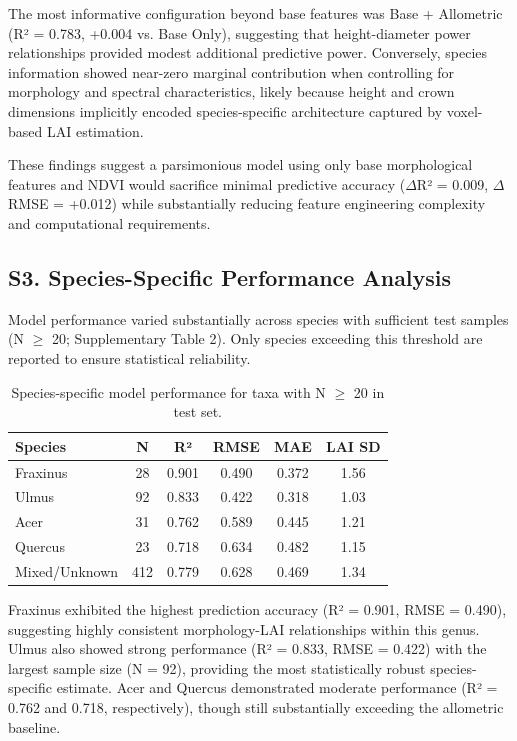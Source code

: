 The most informative configuration beyond base features was Base + Allometric (R² = 0.783, +0.004 vs. Base Only), suggesting that height-diameter power relationships provided modest additional predictive power. Conversely, species information showed near-zero marginal contribution when controlling for morphology and spectral characteristics, likely because height and crown dimensions implicitly encoded species-specific architecture captured by voxel-based LAI estimation.

These findings suggest a parsimonious model using only base morphological features and NDVI would sacrifice minimal predictive accuracy ($\Delta$R² = 0.009, $\Delta$RMSE = +0.012) while substantially reducing feature engineering complexity and computational requirements.

\subsection*{S3. Species-Specific Performance Analysis}

Model performance varied substantially across species with sufficient test samples (N $\geq$ 20; Supplementary Table 2). Only species exceeding this threshold are reported to ensure statistical reliability.

\begin{table}[ht!]
    \centering
    \caption{Species-specific model performance for taxa with N $\geq$ 20 in test set.}
    \label{tab:supp_species}
    \begin{tabular}{lccccc}
        \toprule
        Species & N & R² & RMSE & MAE & LAI SD \\
        \midrule
        Fraxinus & 28 & 0.901 & 0.490 & 0.372 & 1.56 \\
        Ulmus & 92 & 0.833 & 0.422 & 0.318 & 1.03 \\
        Acer & 31 & 0.762 & 0.589 & 0.445 & 1.21 \\
        Quercus & 23 & 0.718 & 0.634 & 0.482 & 1.15 \\
        Mixed/Unknown & 412 & 0.779 & 0.628 & 0.469 & 1.34 \\
        \bottomrule
    \end{tabular}
\end{table}

Fraxinus exhibited the highest prediction accuracy (R² = 0.901, RMSE = 0.490), suggesting highly consistent morphology-LAI relationships within this genus. Ulmus also showed strong performance (R² = 0.833, RMSE = 0.422) with the largest sample size (N = 92), providing the most statistically robust species-specific estimate. Acer and Quercus demonstrated moderate performance (R² = 0.762 and 0.718, respectively), though still substantially exceeding the allometric baseline.

